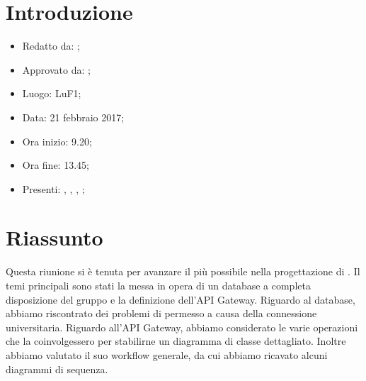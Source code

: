 \section{Introduzione}

	\begin{itemize}
		\item Redatto da: \MC;
		\item Approvato da: \AS;
		\item Luogo: LuF1;
		\item Data: 21 febbraio 2017;
		\item Ora inizio: 9.20;
		\item Ora fine: 13.45;
		\item Presenti: \DAN, \DS, \MC, \NS;		
	\end{itemize}

\section{Riassunto}
Questa riunione si è tenuta per avanzare il più possibile nella progettazione di \progetto. Il temi principali sono stati la messa in opera di un database a completa disposizione del gruppo e la definizione dell'API Gateway. Riguardo al database, abbiamo riscontrato dei problemi di permesso a causa della connessione universitaria. Riguardo all'API Gateway, abbiamo considerato le varie operazioni che la coinvolgessero per stabilirne un diagramma di classe dettagliato. Inoltre abbiamo valutato il suo workflow generale, da cui abbiamo ricavato alcuni diagrammi di sequenza.